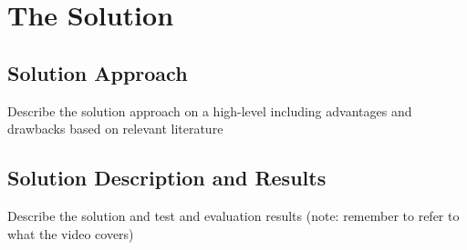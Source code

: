 \chapter{The Solution}

\section{Solution Approach}
Describe the solution approach on a high-level including advantages and drawbacks based on relevant literature 

\section{Solution Description and Results} 
Describe the solution and test and evaluation results (note: remember to refer to what the video covers)